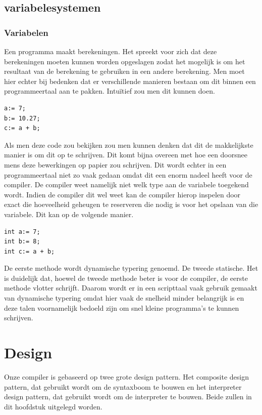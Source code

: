 \documentclass[11pt,a4paper]{article}
\begin{document}
\subsection{variabelesystemen}
\subsubsection{Variabelen}
Een programma maakt berekeningen. Het spreekt voor zich dat deze berekeningen moeten kunnen worden opgeslagen zodat het mogelijk is om het resultaat van de berekening te gebruiken in een andere berekening. Men moet hier echter bij bedenken dat er verschillende manieren bestaan om dit binnen een programmeertaal aan te pakken. Intuïtief zou men dit kunnen doen.

\begin{verbatim}
a:= 7;
b:= 10.27;
c:= a + b;
\end{verbatim}

Als men deze code zou bekijken zou men kunnen denken dat dit de makkelijkste manier is om dit op te schrijven. Dit komt bijna overeen met hoe een doorsnee mens deze bewerkingen op papier zou schrijven. Dit wordt echter in een programmeertaal niet zo vaak gedaan omdat dit een enorm nadeel heeft voor de compiler. De compiler weet namelijk niet welk type aan de variabele toegekend wordt. Indien de compiler dit wel weet kan de compiler hierop inspelen door exact die hoeveelheid geheugen te reserveren die nodig is voor het opslaan van die variabele. Dit kan op de volgende manier.

\begin{verbatim}
int a:= 7;
int b:= 8;
int c:= a + b;
\end{verbatim}

De eerste methode wordt dynamische typering genoemd. De tweede statische. Het is duidelijk dat, hoewel de tweede methode beter is voor de compiler, de eerste methode vlotter schrijft. Daarom wordt er in een scripttaal vaak gebruik gemaakt van dynamische typering omdat hier vaak de snelheid minder belangrijk is en deze talen voornamelijk bedoeld zijn om snel kleine programma's te kunnen schrijven.  

\section{Design}
Onze compiler is gebaseerd op twee grote design pattern. Het composite design pattern, dat gebruikt wordt om de syntaxboom te bouwen en het interpreter design pattern, dat gebruikt wordt om de interpreter te bouwen. Beide zullen in dit hoofdstuk uitgelegd worden.
\end{document}
